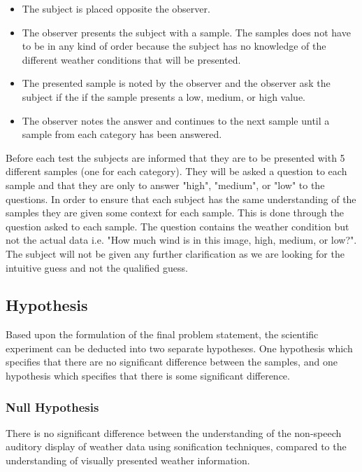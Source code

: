 \begin{itemize}
    \item The subject is placed opposite the observer.
    \item The observer presents the subject with a sample. The samples does not have to be in any kind of order because the subject has no knowledge of the different weather conditions that will be presented.
    \item The presented sample is noted by the observer and the observer ask the subject if the if the sample presents a low, medium, or high value.
    \item The observer notes the answer and continues to the next sample until a sample from each category has been answered.
\end{itemize}

Before each test the subjects are informed that they are to be presented with 5 different samples (one for each category).
They will be asked a question to each sample and that they are only to answer "high", "medium", or "low" to the questions. 
In order to ensure that each subject has the same understanding of the samples they are given some context for each sample.
This is done through the question asked to each sample. 
The question contains the weather condition but not the actual data i.e. "How much wind is in this image, high, medium, or low?". 
The subject will not be given any further clarification as we are looking for the intuitive guess and not the qualified guess.



\subsection{Hypothesis} %
\label{sub:hypothesis}

Based upon the formulation of the final problem statement, the scientific experiment can be deducted into two separate hypotheses. 
One hypothesis which specifies that there are no significant difference between the samples, and one hypothesis which specifies that there is some significant difference.


\subsubsection{Null Hypothesis} %
\label{ssub:null_hypothesis}

There is no significant difference between the understanding of the non-speech auditory display of weather data using sonification techniques, compared to the understanding of visually presented weather information.

